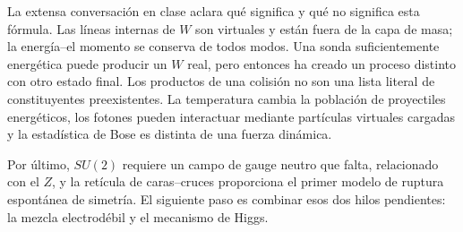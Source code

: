 La extensa conversación en clase aclara qué significa y qué no significa esta fórmula.
Las líneas internas de \(W\) son virtuales y están fuera de la capa de masa; la energía--el momento
se conserva de todos modos. Una sonda suficientemente energética puede producir un \(W\) real, pero entonces
ha creado un proceso distinto con otro estado final. Los productos de una colisión no son una
lista literal de constituyentes preexistentes. La temperatura cambia la población
de proyectiles energéticos, los fotones pueden interactuar mediante partículas virtuales
cargadas y la estadística de Bose es distinta de una fuerza dinámica.

Por último, \(SU(2)\) requiere un campo de gauge neutro que falta, relacionado con el
\(Z\), y la retícula de caras--cruces proporciona el primer modelo de ruptura
espontánea de simetría. El siguiente paso es combinar esos dos hilos pendientes:
la mezcla electrodébil y el mecanismo de Higgs.
